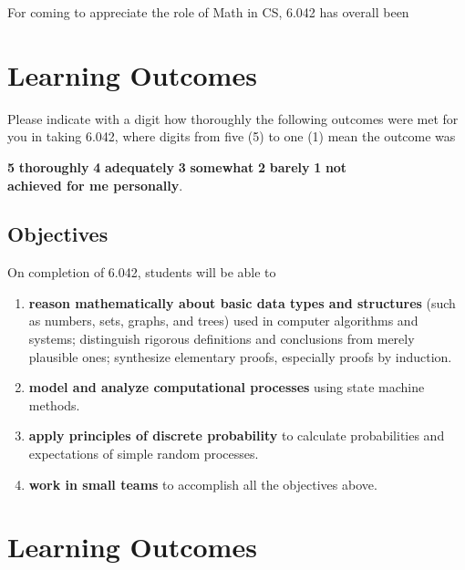 \documentclass[handout]{mcs}
\begin{document}
For coming to appreciate the role of
Math in CS, 6.042 has overall been \hfill \brule{0.5in}

\newpage
\section*{Learning Outcomes}

Please indicate with a digit how thoroughly the following outcomes
were met for you in taking 6.042, where digits from five (5) to one
(1) mean the outcome was
\begin{center}
\textbf{5}  \textbf{thoroughly} \qquad
\textbf{4}  \textbf{adequately}\qquad
\textbf{3} \textbf{somewhat}\qquad
\textbf{2} \textbf{barely}\qquad
\textbf{1} \textbf{not}\\

\textbf{achieved for me personally}.
\end{center}

\iffalse

\subsection{Objectives}
On completion of 6.042, students will be able to
\begin{enumerate}
\item
\label{Basic Discrete Mathematics Concepts}
\textbf{reason mathematically about basic data types and structures} (such
as numbers, sets, graphs, and trees) used in computer algorithms and
systems; distinguish rigorous definitions and conclusions from merely
plausible ones; synthesize elementary proofs, especially proofs by
induction.\brule{0.5in}

\item
\label{Computational Processes} 
\textbf{model and analyze computational processes} using state machine
methods.\brule{0.5in}

\item \label{Discrete Probability} \textbf{apply principles of discrete
probability} to calculate probabilities and expectations of simple random
processes.\brule{0.5in}

\item 
\label{teams} 
\textbf{work in small teams} to accomplish all the objectives above.\brule{0.5in}
\end{enumerate}

\section*{Learning Outcomes}
\end{document}
